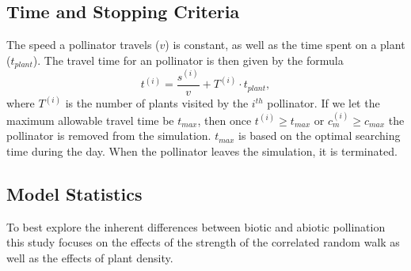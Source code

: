 \subsection{Time and Stopping Criteria}

The speed a pollinator travels ($v$) is constant, as well as the time spent on a
plant ($t_{plant}$).  The travel time for an pollinator is then given by the formula
\[
t^{\left(i\right)} = \frac{s^{\left(i\right)}}{v} + T^{\left(i\right)} \cdot t_{plant},
\]
where $T^{\left(i\right)}$ is the number of plants visited by the $i^{th}$ pollinator. If we let the
maximum allowable travel time be $t_{max}$, then once $t^{\left(i\right)} \geq t_{max}$ or
$c^{\left(i\right)}_m \geq c_{max}$ the pollinator is removed from the simulation. $t_{max}$ is based
on the optimal searching time during the day.  When the pollinator leaves the simulation, it is terminated.

\subsection{Model Statistics}

To best explore the inherent differences between biotic and abiotic pollination this study focuses
on the effects of the strength of the correlated random walk as well as the effects of plant density.

